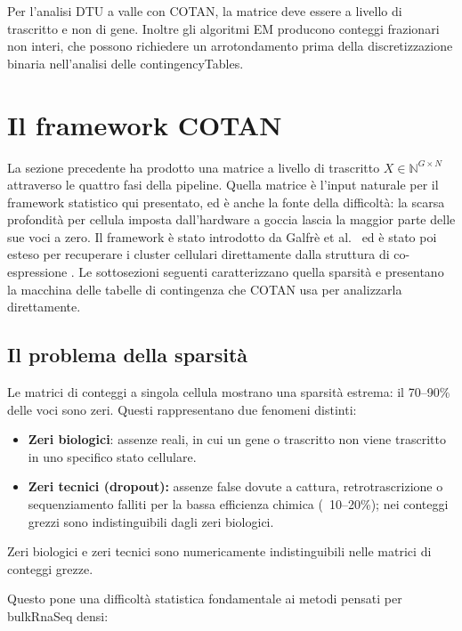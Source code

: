 Per l'analisi DTU a valle con COTAN, la matrice deve essere a livello di trascritto e non di gene. Inoltre gli algoritmi EM producono conteggi frazionari non interi, che possono richiedere un arrotondamento prima della discretizzazione binaria nell'analisi delle \glspl{contingencyTable}.

\section{Il framework COTAN}

La sezione precedente ha prodotto una matrice a livello di trascritto $X \in \mathbb{N}^{G \times N}$ attraverso le quattro fasi della pipeline. Quella matrice è l'input naturale per il framework statistico qui presentato, ed è anche la fonte della difficoltà: la scarsa profondità per cellula imposta dall'hardware a goccia lascia la maggior parte delle sue voci a zero. Il framework è stato introdotto da Galfr\`e et al.\ \cite{galfre2021cotan} ed è stato poi esteso per recuperare i cluster cellulari direttamente dalla struttura di co-espressione \cite{galfre2026gene}. Le sottosezioni seguenti caratterizzano quella sparsità e presentano la macchina delle tabelle di contingenza che COTAN usa per analizzarla direttamente.

\subsection{Il problema della sparsità}
Le matrici di conteggi a singola cellula mostrano una sparsità estrema: il 70--90\% delle voci sono zeri\cite{galfre2021cotan}. Questi rappresentano due fenomeni distinti:
\begin{itemize}
    \item \textbf{Zeri biologici}: assenze reali, in cui un gene o trascritto non viene trascritto in uno specifico stato cellulare.
    \item \textbf{Zeri tecnici (dropout):} assenze false dovute a cattura, retrotrascrizione o sequenziamento falliti per la bassa efficienza chimica (~10--20\%); nei conteggi grezzi sono indistinguibili dagli zeri biologici.
\end{itemize}

Zeri biologici e zeri tecnici sono numericamente indistinguibili nelle matrici di conteggi grezze.


Questo pone una difficoltà statistica fondamentale ai metodi pensati per \gls{bulkRnaSeq} densi:

